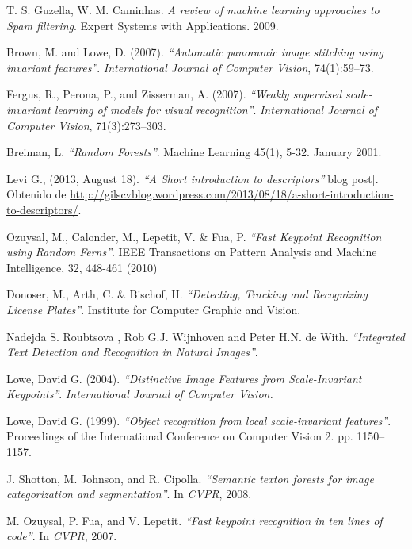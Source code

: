 \begin{thebibliography}{100}
		T. S. Guzella, W. M. Caminhas.
		\emph{A review of machine learning approaches to Spam filtering}.
		Expert Systems with Applications.
		2009.
		
		Brown, M. and Lowe, D. (2007).
		\emph{``Automatic panoramic image stitching using invariant features''}.
		\textit{International Journal of Computer Vision},
		74(1):59–73.
	
		Fergus, R., Perona, P., and Zisserman, A. (2007).
		\emph{``Weakly supervised scale-invariant learning of models for visual recognition''}.
		\textit{International Journal of Computer Vision},
		71(3):273–303.
		
		Breiman, L.
		\emph{``Random Forests''}.
		Machine Learning 45(1), 5-32.
		January 2001.
		
				
		Levi G., (2013, August 18).
		\emph{``A Short introduction to descriptors''}[blog post].
		Obtenido de \url{http://gilscvblog.wordpress.com/2013/08/18/a-short-introduction-to-descriptors/}.
	
		Ozuysal, M., Calonder, M., Lepetit, V. \& Fua, P.
		\emph{``Fast Keypoint Recognition using Random Ferns''}.
		IEEE Transactions on Pattern Analysis and Machine Intelligence,
		32, 448-461 (2010)
		
		Donoser, M., Arth, C. \& Bischof, H.
		\emph{``Detecting, Tracking and Recognizing License Plates''}.
		Institute for Computer Graphic and Vision.
		
		Nadejda S. Roubtsova , Rob G.J. Wijnhoven and Peter H.N. de With.
		\emph{``Integrated Text Detection and Recognition in Natural Images''}.
		
		Lowe, David G. (2004).
		\emph{``Distinctive Image Features from Scale-Invariant Keypoints''}.
		\textit{International Journal of Computer Vision.}
		
		Lowe, David G. (1999).
		\emph{``Object recognition from local scale-invariant features''}.
		Proceedings of the International Conference on Computer Vision 2.
		pp. 1150–1157.
		
		J. Shotton, M. Johnson, and R. Cipolla.
		\emph{``Semantic texton forests for image categorization and segmentation''}.
		In \textit{CVPR}, 2008.
		
		M. Ozuysal, P. Fua, and V. Lepetit.
		\emph{``Fast keypoint recognition in ten lines of code''}.
		In \textit{CVPR}, 2007.
		

\end{thebibliography}

